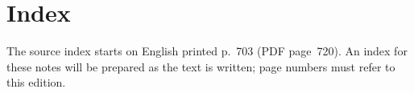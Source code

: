 \chapter*{Index}
The source index starts on English printed p.~703 (PDF page~720). An index for these notes will be prepared as the text is written; page numbers must refer to this edition.

\PDEPending

